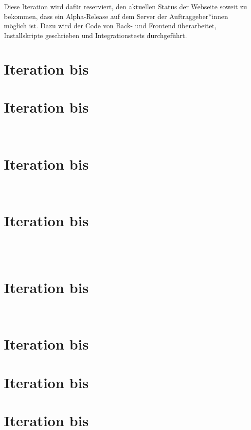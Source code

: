 \documentclass
[english,accentcolor=tud1c]
{tudreport}
\begin{document}
	Diese Iteration wird dafür reserviert, den aktuellen Status der Webseite soweit zu bekommen, dass ein Alpha-Release auf dem Server der Auftraggeber*innen möglich ist. Dazu wird der Code von Back- und Frontend überarbeitet, Installskripte geschrieben und Integrationstests durchgeführt.

	\chapter{Iteration bis } %
	

	\chapter{Iteration bis } %
	\\
	

	\chapter{Iteration bis } %
	\\
	

	\chapter{Iteration bis } %
	\\
	\\
	

	\chapter{Iteration bis } %
	\\
	

	\chapter{Iteration bis } %


	\chapter{Iteration bis } %

	\chapter{Iteration bis } %
	\\
	\\
	\\
	
	\\
\end{document}
